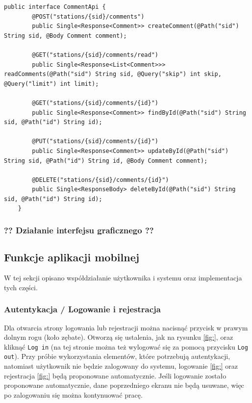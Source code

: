 \begin{lstlisting}[label=list:android_api_comment,caption=Plik \texttt{main/java/com/example/testapp/api/api/CommentApi.java},basicstyle=\tiny\ttfamily]
    public interface CommentApi {
        @POST("stations/{sid}/comments")
        public Single<Response<Comment>> createComment(@Path("sid") String sid, @Body Comment comment);
    
        @GET("stations/{sid}/comments/read")
        public Single<Response<List<Comment>>> readComments(@Path("sid") String sid, @Query("skip") int skip, @Query("limit") int limit);
    
        @GET("stations/{sid}/comments/{id}")
        public Single<Response<Comment>> findById(@Path("sid") String sid, @Path("id") String id);
    
        @PUT("stations/{sid}/comments/{id}")
        public Single<Response<Comment>> updateById(@Path("sid") String sid, @Path("id") String id, @Body Comment comment);
    
        @DELETE("stations/{sid}/comments/{id}")
        public Single<ResponseBody> deleteById(@Path("sid") String sid, @Path("id") String id);
    }
\end{lstlisting}

\subsubsection{?? Działanie interfejsu graficznego ??}

\subsection{Funkcje aplikacji mobilnej}
W tej sekcji opisano współdziałanie użytkownika i systemu oraz implementacja tych części.

\subsubsection{Autentykacja / Logowanie i rejestracja}
Dla otwarcia strony logowania lub rejestracji można nacisnąć przycisk w prawym dolnym rogu (koło zębate). Otworzą się ustalenia, jak na rysunku \ref{fig:}, oraz kliknąć \texttt{Log in} (na tej stronie można też wylogować się za pomocą przycisku \texttt{Log out}).
Przy próbie wykorzystania elementów, które potrzebują autentykacji, natomiast użytkownik nie będzie zalogowany do systemu, logowanie \ref{fig:} oraz rejestracja \ref{fig:} będą proponowane automatycznie. Jeśli logowanie zostało proponowane automatycznie, dane poprzedniego ekranu nie będą usuwane, więc po zalogowaniu się można kontynuować pracę.


